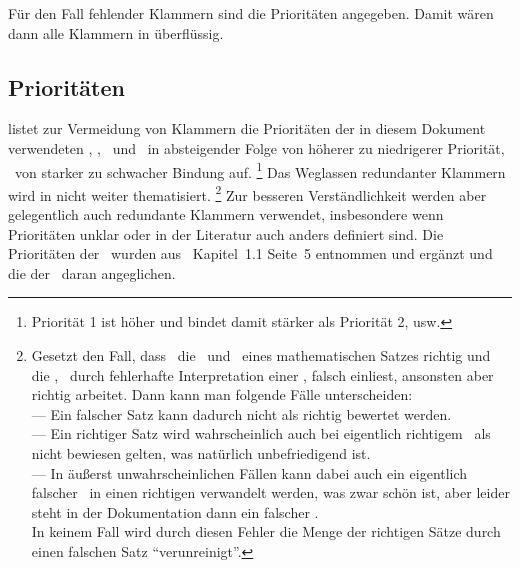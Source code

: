 Für den Fall fehlender Klammern sind die Prioritäten  angegeben.
Damit wären dann alle Klammern in  überflüssig.

\subsection{Prioritäten}%
\label {sub-Prioritaeten}

 listet zur Vermeidung von Klammern die Prioritäten der in diesem Dokument verwendeten \Operationen, \Relationen, \Junktoren\ und \Definitionen\ in absteigender Folge von höherer zu niedrigerer Priorität, \textdh\ von starker zu schwacher Bindung auf.%
\footnote{Priorität 1 ist höher und bindet damit stärker als Priorität 2, usw.}
Das Weglassen redundanter Klammern wird in  nicht weiter thematisiert.%
\footnote{%
	Gesetzt den Fall, dass \ASBA\ die \Voraussetzungen\ und \Folgerungen\ eines mathematischen Satzes richtig und die \Beweisschritte, \textzB\ durch fehlerhafte Interpretation einer \Formel, falsch einliest, ansonsten aber richtig arbeitet.
	Dann kann man folgende Fälle unterscheiden:\\
	--- Ein falscher Satz kann dadurch nicht als richtig bewertet werden.\\
	--- Ein richtiger Satz wird wahrscheinlich auch bei eigentlich richtigem \Beweis\ als nicht bewiesen gelten, was natürlich unbefriedigend ist.\\
	--- In äußerst unwahrscheinlichen Fällen kann dabei auch ein eigentlich falscher \Beweis\ in einen richtigen verwandelt werden, was zwar schön ist, aber leider steht in der Dokumentation dann ein falscher \Beweis.\\
	In keinem Fall wird durch diesen Fehler die Menge der richtigen Sätze durch einen falschen Satz "`verunreinigt"'.
}
Zur besseren Verständlichkeit werden aber gelegentlich auch redundante Klammern verwendet, insbesondere wenn Prioritäten unklar oder in der Literatur auch anders definiert sind.
Die Prioritäten der \Junktoren\ wurden aus~\cite{bib:Rautenberg} Kapitel~1.1 Seite~5 entnommen und ergänzt und die der \Metaoperationen\ daran angeglichen.

